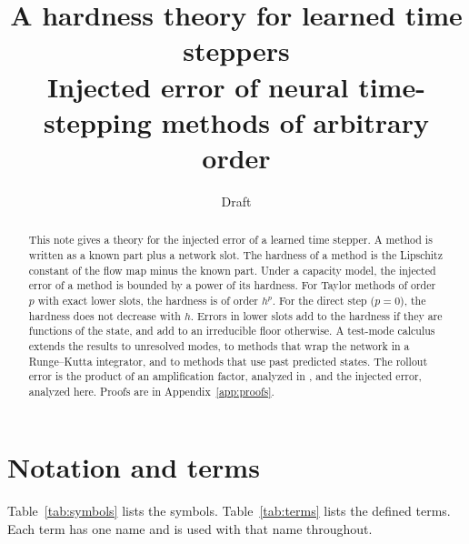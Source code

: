 \documentclass[11pt]{article}
\title{A hardness theory for learned time steppers\\[4pt]
\large Injected error of neural time-stepping methods of arbitrary order}
\author{Draft}
\date{}
\theoremstyle{definition}
\theoremstyle{remark}
\begin{document}
\maketitle

\begin{abstract}
This note gives a theory for the injected error of a learned time stepper.
A method is written as a known part plus a network slot.
The hardness of a method is the Lipschitz constant of the flow map minus the known part.
Under a capacity model, the injected error of a method is bounded by a power of its hardness.
For Taylor methods of order $p$ with exact lower slots, the hardness is of order $h^p$.
For the direct step ($p=0$), the hardness does not decrease with $h$.
Errors in lower slots add to the hardness if they are functions of the state, and add to an irreducible floor otherwise.
A test-mode calculus extends the results to unresolved modes, to methods that wrap the network in a Runge--Kutta integrator, and to methods that use past predicted states.
The rollout error is the product of an amplification factor, analyzed in \cite{ainslie2026}, and the injected error, analyzed here.
Proofs are in Appendix~\ref{app:proofs}.
\end{abstract}

\tableofcontents

\section{Notation and terms}\label{sec:notation}

Table~\ref{tab:symbols} lists the symbols.
Table~\ref{tab:terms} lists the defined terms.
Each term has one name and is used with that name throughout.
\end{document}
